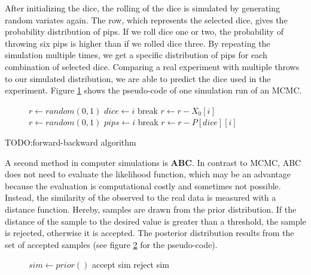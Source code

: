 After initializing the dice, the rolling of the dice is simulated by generating random variates again. The row, which represents the selected dice, gives the probability distribution of pips. If we roll dice one or two, the probability of throwing six pips is higher than if we rolled dice three. By repeating the simulation multiple times, we get a specific distribution of pips for each combination of selected dice. Comparing a real experiment with multiple throws to our simulated distribution, we are able to predict the dice used in the experiment. Figure \ref{MCMC} shows the pseudo-code of one simulation run of an MCMC.
\begin{figure}
\begin{algorithmic}
\State $r \gets random(0,1)$
\State $dice \gets i$
\State break
\Else
\State $r \gets r - X_0[i]$
\EndIf
\EndFor
\State $r \gets random(0,1)$
\State $pips \gets i$
\State break
\Else
\State $r \gets r - P[dice][i]$
\EndIf
\EndFor
\end{algorithmic}
\label{MCMC}
\end{figure}

TODO:forward-backward algorithm

A second method in computer simulations is \textbf{\ac{ABC}}. In contrast to \ac{MCMC}, \ac{ABC} does not need to evaluate the likelihood function, which may be an advantage because the evaluation is computational costly and sometimes not possible. Instead, the similarity of the observed to the real data is measured with a distance function. Hereby, samples are drawn from the prior distribution. If the distance of the sample to the desired value is greater than a threshold, the sample is rejected, otherwise it is accepted. The posterior distribution results from the set of accepted samples (see figure \ref{ABC} for the pseudo-code).\cite{ABC}
\begin{figure}[h]
\begin{algorithmic}
\State $sim \gets prior()$
\State accept sim
\Else
\State reject sim
\EndIf
\end{algorithmic}
\label{ABC}
\end{figure}


